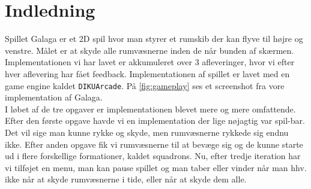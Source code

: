 

\section{Indledning}
Spillet Galaga er et 2D spil hvor man styrer et rumskib der kan flyve til højre og venstre. Målet er at skyde alle rumvæsnerne inden de når bunden af skærmen. Implementationen vi har lavet er akkumuleret over 3 afleveringer, hvor vi efter hver aflevering har fået feedback. Implementationen af spillet er lavet med en game engine kaldet \texttt{DIKUArcade}. På \autoref{fig:gameplay} ses et screenshot fra vore implementation af Galaga.
\\I løbet af de tre opgaver er implementationen blevet mere og mere omfattende. Efter den første opgave havde vi en implementation der lige nøjagtig var spil-bar. Det vil sige man kunne rykke og skyde, men rumvæsnerne rykkede sig endnu ikke. Efter anden opgave fik vi rumvæsnerne til at bevæge sig og de kunne starte ud i flere forskellige formationer, kaldet squadrons. Nu, efter tredje iteration har vi tilføjet en menu, man kan pause spillet og man taber eller vinder når man hhv. ikke når at skyde rumvæsnerne i tide, eller når at skyde dem alle.
